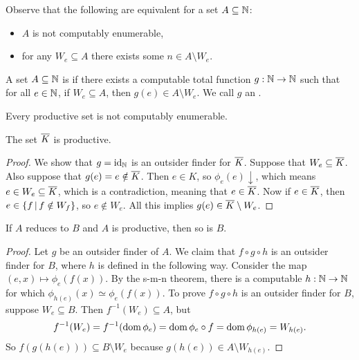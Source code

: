 
Observe that the following are equivalent for a set $A \subseteq \mathbb{N}$:
\begin{itemize}
\item $A$ is not computably enumerable,
\item for any $W_e \subseteq A$ there exists some $n \in A \setminus W_e$.
\end{itemize}
A set $A \subseteq \mathbb{N}$ is  if there exists a computable total
function $g: \mathbb{N} \to \mathbb{N}$ such that for all $e \in \mathbb{N}$, if $W_e \subseteq A$, then
$g(e) \in A \setminus W_e$.
We call $g$ an .

\begin{proposition}
  Every productive set is not computably enumerable.
\end{proposition}

\begin{proposition}
  The set $\overline{K}$ is productive.
\end{proposition}

\begin{proof}
  We show that $g = \operatorname{id}_{\mathbb{N}}$ is an outsider finder for $\overline{K}$.
  Suppose that $W_e \subseteq \overline{K}$.
  Also suppose that $g(e) = e \notin \overline{K}$.
  Then $e \in K$, so $\phi_e(e) \downarrow$, which means $e \in W_e \subseteq
  \overline{K}$, which is a contradiction, meaning that $e \in \overline{K}$.
  Now if $e \in \overline{K}$, then $e \in \{ f \,|\, f \notin W_f \}$, so $e \notin
  W_e$.
  All this implies $g(e) \in \overline{K} \setminus W_e$.
\end{proof}

\begin{lemma}
  If $A$ reduces to $B$ and $A$ is productive, then so is $B$.
\end{lemma}

\begin{proof}
  Let $g$ be an outsider finder of $A$.
  We claim that $f \circ g \circ h$ is an outsider finder for $B$, where $h$ is
  defined in the following way.
  Consider the map $(e,x) \mapsto \phi_e(f(x))$.
  By the s-m-n theorem, there is a computable $h: \mathbb{N} \to \mathbb{N}$ for which
  $\phi_{h(e)}(x) \simeq \phi_e(f(x))$.
  To prove $f \circ g \circ h$ is an outsider finder for $B$, suppose $W_e
  \subseteq B$.
  Then $f^{-1}(W_e) \subseteq A$, but
  \[
	f^{-1}(W_e) = f^{-1}(\operatorname{dom} \phi_e) = \operatorname{dom} \phi_e
	\circ f = \operatorname{dom} \phi_{h(e)} = W_{h(e)}.
  \]
  So $f(g(h(e))) \subseteq B \setminus W_e$ because $g(h(e)) \in A \setminus
  W_{h(e)}$.
\end{proof}

